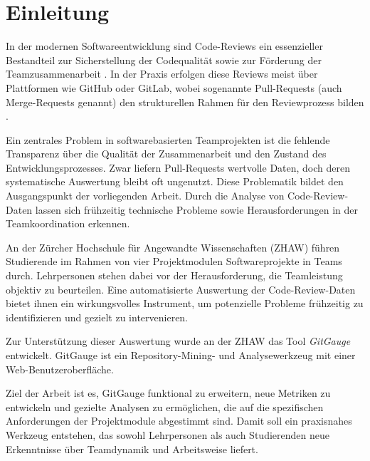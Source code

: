 


\chapter{Einleitung} %
In der modernen Softwareentwicklung sind Code-Reviews ein essenzieller Bestandteil zur Sicherstellung der Codequalität sowie zur Förderung der Teamzusammenarbeit \parencite{dos_santos_investigating_2018}. In der Praxis erfolgen diese Reviews meist über Plattformen wie GitHub oder GitLab, wobei sogenannte Pull-Requests (auch Merge-Requests genannt) den strukturellen Rahmen für den Reviewprozess bilden \parencite{noauthor_team_nodate}.

Ein zentrales Problem in softwarebasierten Teamprojekten ist die fehlende Transparenz über die Qualität der Zusammenarbeit und den Zustand des Entwicklungsprozesses. Zwar liefern Pull-Requests wertvolle Daten, doch deren systematische Auswertung bleibt oft ungenutzt. Diese Problematik bildet den Ausgangspunkt der vorliegenden Arbeit. Durch die Analyse von Code-Review-Daten lassen sich frühzeitig technische Probleme sowie Herausforderungen in der Teamkoordination erkennen.

An der Zürcher Hochschule für Angewandte Wissenschaften (ZHAW) führen Studierende im Rahmen von vier Projektmodulen Softwareprojekte in Teams durch. Lehrpersonen stehen dabei vor der Herausforderung, die Teamleistung objektiv zu beurteilen. Eine automatisierte Auswertung der Code-Review-Daten bietet ihnen ein wirkungsvolles Instrument, um potenzielle Probleme frühzeitig zu identifizieren und gezielt zu intervenieren.

Zur Unterstützung dieser Auswertung wurde an der ZHAW das Tool \textit{GitGauge} entwickelt. GitGauge ist ein Repository-Mining- und Analysewerkzeug mit einer Web-Benutzeroberfläche.

Ziel der Arbeit ist es, GitGauge funktional zu erweitern, neue Metriken zu entwickeln und gezielte Analysen zu ermöglichen, die auf die spezifischen Anforderungen der Projektmodule abgestimmt sind. Damit soll ein praxisnahes Werkzeug entstehen, das sowohl Lehrpersonen als auch Studierenden neue Erkenntnisse über Teamdynamik und Arbeitsweise liefert.

